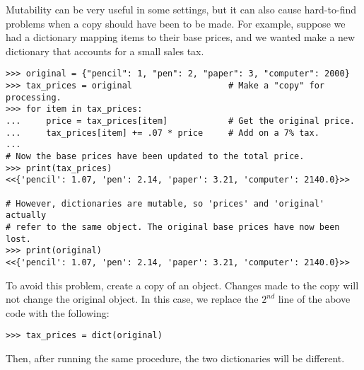 \begin{warn} %
Mutability can be very useful in some settings, but it can also cause hard-to-find problems when a copy should have been to be made.
For example, suppose we had a dictionary mapping items to their base prices, and we wanted make a new dictionary that accounts for a small sales tax.

\begin{lstlisting}
>>> original = {"pencil": 1, "pen": 2, "paper": 3, "computer": 2000}
>>> tax_prices = original                   # Make a "copy" for processing.
>>> for item in tax_prices:
...     price = tax_prices[item]            # Get the original price.
...     tax_prices[item] += .07 * price     # Add on a 7% tax.
...
# Now the base prices have been updated to the total price.
>>> print(tax_prices)
<<{'pencil': 1.07, 'pen': 2.14, 'paper': 3.21, 'computer': 2140.0}>>

# However, dictionaries are mutable, so 'prices' and 'original' actually
# refer to the same object. The original base prices have now been lost.
>>> print(original)
<<{'pencil': 1.07, 'pen': 2.14, 'paper': 3.21, 'computer': 2140.0}>>
\end{lstlisting}

To avoid this problem, create a copy of an object.
Changes made to the copy will not change the original object.
In this case, we replace the $2^{nd}$ line of the above code with the following:
\begin{lstlisting}
>>> tax_prices = dict(original)
\end{lstlisting}
Then, after running the same procedure, the two dictionaries will be different.
\end{warn}

